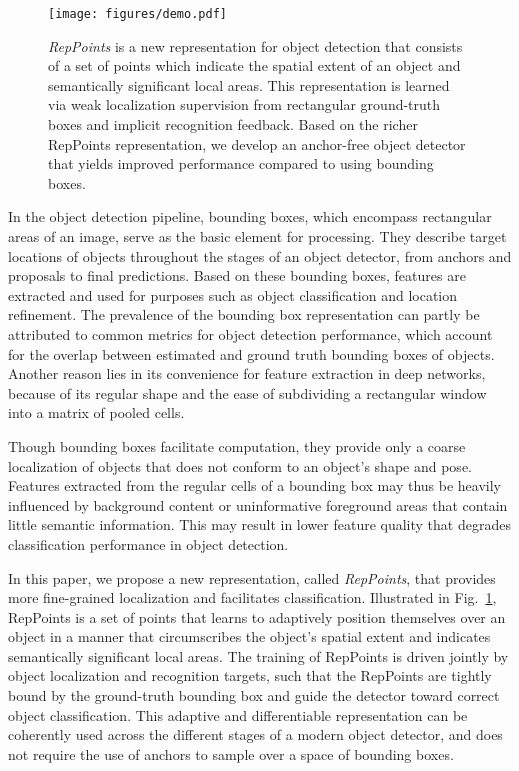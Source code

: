 \documentclass[10pt,twocolumn,letterpaper]{article}
\begin{document}
\begin{figure}[tb]
\centering
\vspace{-10pt}
\texttt{[image: figures/demo.pdf]}
\caption{\textit{RepPoints} is a new representation for object detection that consists of a set of points which indicate the spatial extent of an object and semantically significant local areas. This representation is learned via weak localization supervision from rectangular ground-truth boxes and implicit recognition feedback. Based on the richer RepPoints representation, we develop an anchor-free object detector that yields improved performance compared to using bounding boxes.}
\vspace{-10pt}
\label{fig::demo}
\end{figure}
 
In the object detection pipeline, bounding boxes, which encompass rectangular areas of an image, serve as the basic element for processing. They describe target locations of objects throughout the stages of an object detector, from anchors and proposals to final predictions. Based on these bounding boxes, features are extracted and used for purposes such as object classification and location refinement. The prevalence of the bounding box representation can partly be attributed to common metrics for object detection performance, which account for the overlap between estimated and ground truth bounding boxes of objects. Another reason lies in its convenience for feature extraction in deep networks, because of its regular shape and the ease of subdividing a rectangular window into a matrix of pooled cells.

Though bounding boxes facilitate computation, they provide only a coarse localization of objects that does not conform to an object's shape and pose. Features extracted from the regular cells of a bounding box may thus be heavily influenced by background content or uninformative foreground areas that contain little semantic information. This may result in lower feature quality that degrades classification performance in object detection.

In this paper, we propose a new representation, called \textit{RepPoints}, that provides more fine-grained localization and facilitates classification. Illustrated in Fig.~\ref{fig::demo}, RepPoints is a set of points that learns to adaptively position themselves over an object in a manner that circumscribes the object's spatial extent and indicates semantically significant local areas. The training of RepPoints is driven jointly by object localization and recognition targets, such that the RepPoints are tightly bound by the ground-truth bounding box and guide the detector toward correct object classification. This adaptive and differentiable representation can be coherently used across the different stages of a modern object detector, and does not require the use of anchors to sample over a space of bounding boxes.
\end{document}
